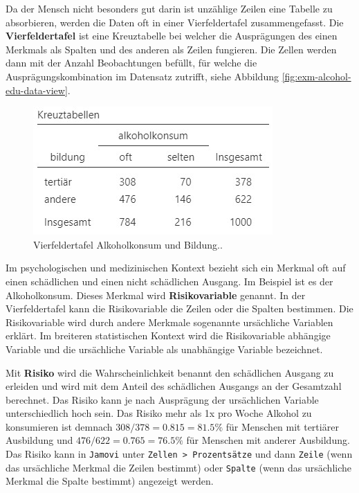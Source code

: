 \documentclass[
]{book}
\theoremstyle{definition}
\theoremstyle{definition}
\theoremstyle{definition}
\theoremstyle{definition}
\theoremstyle{remark}
\begin{document}
Da der Mensch nicht besonders gut darin ist unzählige Zeilen eine
Tabelle zu absorbieren, werden die Daten oft in einer Vierfeldertafel
zusammengefasst. \label{customdef-vierfeldertafel}{Die \textbf{Vierfeldertafel} ist eine Kreuztabelle bei
welcher die Ausprägungen des einen Merkmals als Spalten und des anderen
als Zeilen fungieren.} Die Zellen werden dann mit der Anzahl Beobachtungen befüllt,
für welche die Ausprägungskombination im Datensatz zutrifft, siehe
Abbildung \ref{fig:exm-alcohol-edu-data-view}.

\begin{figure}

{\centering \includegraphics[width=0.5\linewidth]{figures/09-exm-alcohol-edu-aggdata-view} 

}

\caption{Vierfeldertafel Alkoholkonsum und Bildung..}\label{fig:exm-alcohol-edu-aggdata-view}
\end{figure}

Im psychologischen und medizinischen Kontext bezieht sich ein Merkmal
oft auf einen schädlichen und einen nicht schädlichen Ausgang. Im
Beispiel ist es der Alkoholkonsum. \label{customdef-risikovariable}{Dieses Merkmal wird
\textbf{Risikovariable} genannt.} In der Vierfeldertafel kann die Risikovariable die Zeilen
oder die Spalten bestimmen. Die Risikovariable wird durch andere
Merkmale sogenannte ursächliche Variablen erklärt. Im breiteren
statistischen Kontext wird die Risikovariable abhängige Variable und die
ursächliche Variable als unabhängige Variable bezeichnet.

\label{customdef-risiko}{Mit \textbf{Risiko} wird die Wahrscheinlichkeit benannt den schädlichen
Ausgang zu erleiden und wird mit dem Anteil des schädlichen Ausgangs an
der Gesamtzahl berechnet.}
Das Risiko kann je nach Ausprägung der ursächlichen Variable
unterschiedlich hoch sein. Das Risiko mehr als 1x pro Woche Alkohol zu
konsumieren ist demnach
\(308/378 = 0.815 = 81.5\%\) für
Menschen mit tertiärer Ausbildung und
\(476/622 = 0.765 = 76.5\%\) für
Menschen mit anderer Ausbildung. Das Risiko kann in \texttt{Jamovi} unter
\texttt{Zellen\ \textgreater{}\ Prozentsätze} und dann \texttt{Zeile} (wenn das ursächliche Merkmal
die Zeilen bestimmt) oder \texttt{Spalte} (wenn das ursächliche Merkmal die
Spalte bestimmt) angezeigt werden.
\end{document}
